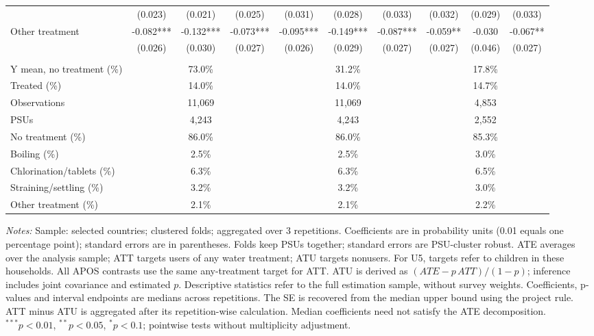 \begin{table}[htbp]
\begin{adjustbox}{max width=\linewidth}
\begin{tabular}{lccccccccc}
 & (0.023) & (0.021) & (0.025) & (0.031) & (0.028) & (0.033) & (0.032) & (0.029) & (0.033) \\
Other treatment & -0.082*** & -0.132*** & -0.073*** & -0.095*** & -0.149*** & -0.087*** & -0.059** & -0.030 & -0.067** \\
 & (0.026) & (0.030) & (0.027) & (0.026) & (0.029) & (0.027) & (0.027) & (0.046) & (0.027) \\
\addlinespace[6pt]
\multicolumn{10}{l}{\textit{Descriptive statistics and sample}} \\
Y mean, no treatment (\%) & \multicolumn{3}{c}{73.0\%} & \multicolumn{3}{c}{31.2\%} & \multicolumn{3}{c}{17.8\%} \\
Treated (\%) & \multicolumn{3}{c}{14.0\%} & \multicolumn{3}{c}{14.0\%} & \multicolumn{3}{c}{14.7\%} \\
Observations & \multicolumn{3}{c}{11,069} & \multicolumn{3}{c}{11,069} & \multicolumn{3}{c}{4,853} \\
PSUs & \multicolumn{3}{c}{4,243} & \multicolumn{3}{c}{4,243} & \multicolumn{3}{c}{2,552} \\
No treatment (\%) & \multicolumn{3}{c}{86.0\%} & \multicolumn{3}{c}{86.0\%} & \multicolumn{3}{c}{85.3\%} \\
Boiling (\%) & \multicolumn{3}{c}{2.5\%} & \multicolumn{3}{c}{2.5\%} & \multicolumn{3}{c}{3.0\%} \\
Chlorination/tablets (\%) & \multicolumn{3}{c}{6.3\%} & \multicolumn{3}{c}{6.3\%} & \multicolumn{3}{c}{6.5\%} \\
Straining/settling (\%) & \multicolumn{3}{c}{3.2\%} & \multicolumn{3}{c}{3.2\%} & \multicolumn{3}{c}{3.0\%} \\
Other treatment (\%) & \multicolumn{3}{c}{2.1\%} & \multicolumn{3}{c}{2.1\%} & \multicolumn{3}{c}{2.2\%} \\
\hline\hline
\end{tabular}
\end{adjustbox}
\par\vspace{3pt}
\begin{minipage}{\linewidth}\scriptsize \textit{Notes:} Sample: selected countries; clustered folds; aggregated over 3 repetitions. Coefficients are in probability units (0.01 equals one percentage point); standard errors are in parentheses. Folds keep PSUs together; standard errors are PSU-cluster robust. ATE averages over the analysis sample; ATT targets users of any water treatment; ATU targets nonusers. For U5, targets refer to children in these households. All APOS contrasts use the same any-treatment target for ATT. ATU is derived as $(ATE-p\,ATT)/(1-p)$; inference includes joint covariance and estimated $p$. Descriptive statistics refer to the full estimation sample, without survey weights. Coefficients, p-values and interval endpoints are medians across repetitions. The SE is recovered from the median upper bound using the project rule. ATT minus ATU is aggregated after its repetition-wise calculation. Median coefficients need not satisfy the ATE decomposition. $^{***}p<0.01$, $^{**}p<0.05$, $^{*}p<0.1$; pointwise tests without multiplicity adjustment.\end{minipage}
\end{table}

